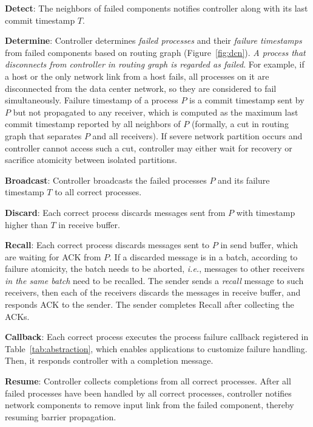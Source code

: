 \begin{ecompact}
\item \textbf{Detect}: The neighbors of failed components notifies controller along with its last commit timestamp $T$.
\item \textbf{Determine}: Controller determines \emph{failed processes} and their \emph{failure timestamps} from failed components based on routing graph (Figure~\ref{fig:dcn}). \emph{A process that disconnects from controller in routing graph is regarded as failed}.
For example, if a host or the only network link from a host fails, all processes on it are disconnected from the data center network, so they are considered to fail simultaneously.
Failure timestamp of a process $P$ is a commit timestamp sent by $P$ but not propagated to any receiver, which is computed as the maximum last commit timestamp reported by all neighbors of $P$ (formally, a cut in routing graph that separates $P$ and all receivers).
If severe network partition occurs and controller cannot access such a cut, controller may either wait for recovery or sacrifice atomicity between isolated partitions.
\item \textbf{Broadcast}: Controller broadcasts the failed processes $P$ and its failure timestamp $T$ to all correct processes.
\item \textbf{Discard}: Each correct process discards messages sent from $P$ with timestamp higher than $T$ in receive buffer.
\item \textbf{Recall}: Each correct process discards messages sent to $P$ in send buffer, which are waiting for ACK from $P$. If a discarded message is in a batch, according to failure atomicity, the batch needs to be aborted, \emph{i.e.}, messages to other receivers \emph{in the same batch} need to be recalled. The sender sends a \emph{recall} message to such receivers, then each of the receivers discards the messages in receive buffer, and responds ACK to the sender. The sender completes Recall after collecting the ACKs.
\item \textbf{Callback}: Each correct process executes the process failure callback registered in Table~\ref{tab:abstraction}, which enables applications to customize failure handling. Then, it responds controller with a completion message.
\item \textbf{Resume}: Controller collects completions from all correct processes.
After all failed processes have been handled by all correct processes, controller notifies network components to remove input link from the failed component, thereby resuming barrier propagation.
\end{ecompact}

